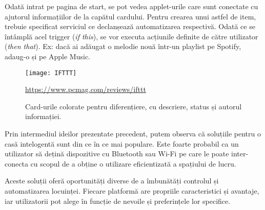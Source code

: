 Odată intrat pe pagina de start, se pot vedea applet-urile care sunt conectate cu ajutorul informațiilor de la capătul cardului. Pentru crearea unui astfel de item, trebuie specificat serviciul ce declanșează automatizarea respectivă. Odată ce se întâmplă acel trigger (\emph{if this}), se vor executa acțiunile definite de către utilizator (\emph{then that}). Ex: dacă ai adăugat o melodie nouă într-un playlist pe Spotify, adaug-o și pe Apple Music.


\begin{figure}[h]
	\centering
	\texttt{[image: IFTTT]}
	\caption{Card-urile colorate pentru diferențiere, cu descriere, status și autorul informației.}\url{https://www.pcmag.com/reviews/ifttt}
	\label{fig:ifttt}
\end{figure}

\break
\hfill

\hfill

Prin intermediul ideilor prezentate precedent, putem observa că soluțiile pentru o casă intelogentă sunt din ce în ce mai populare. Este foarte probabil ca un utilizator să dețină dispozitive cu Bluetooth sau Wi-Fi pe care le poate inter-conecta cu scopul de a obține o utilizare eficientizată a spațiului de lucru.

Aceste soluții oferă oportunități diverse de a îmbunătăți controlul și automatizarea locuinței. Fiecare platformă are propriile caracteristici și avantaje, iar utilizatorii pot alege în funcție de nevoile și preferințele lor specifice.